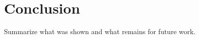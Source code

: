 \section{Conclusion}
\label{sec:conclusion}

Summarize what was shown and what remains for future work.
